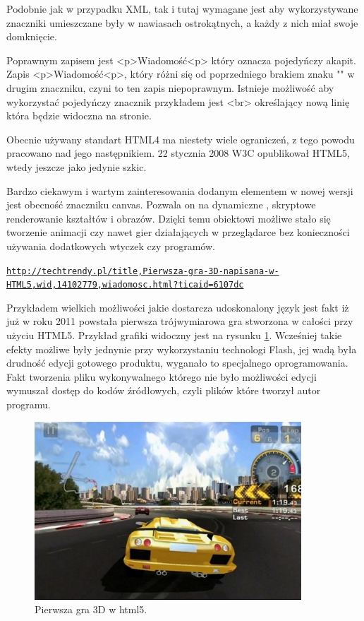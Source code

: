 Podobnie jak w przypadku XML, tak i tutaj wymagane jest aby wykorzystywane znaczniki umieszczane były w nawiasach ostrokątnych, a każdy z nich miał swoje domknięcie.

Poprawnym zapisem jest <p>Wiadomość<p> który oznacza pojedyńczy akapit. Zapis <p>Wiadomość<p>, który różni się od poprzedniego brakiem znaku "" w drugim znaczniku, czyni to ten zapis niepoprawnym. Istnieje możliwość aby wykorzystać pojedyńczy znacznik przykładem jest <br> określający nową linię która będzie widoczna na stronie.

Obecnie używany standart HTML4 ma niestety wiele ograniczeń, z tego powodu pracowano nad jego następnikiem. 22 stycznia 2008 W3C opublikował HTML5, wtedy jeszcze jako jedynie szkic.

Bardzo ciekawym i wartym zainteresowania dodanym elementem w nowej wersji jest obecność znaczniku canvas. Pozwala on na dynamiczne , skryptowe renderowanie kształtów i obrazów. Dzięki temu obiektowi możliwe stało się tworzenie animacji czy nawet gier działających w przeglądarce bez konieczności używania dodatkowych wtyczek czy programów.

\underline{\texttt{http://techtrendy.pl/title,Pierwsza-gra-3D-napisana-w-HTML5,wid,14102779,wiadomosc.html?ticaid=6107dc}}

Przykładem wielkich możliwości jakie dostarcza udoskonalony język jest fakt iż już w roku 2011 powstała pierwsza trójwymiarowa gra stworzona w całości przy użyciu HTML5. Przykład grafiki widoczny jest na rysunku \ref{fig:html3d}.
Wcześniej takie efekty możliwe były jednynie przy wykorzystaniu technologi Flash, jej wadą była drudność edycji gotowego produktu, wyganało to specjalnego oprogramowania. Fakt tworzenia pliku wykonywalnego którego nie było możliwości edycji wymuszał dostęp do kodów źródłowych, czyli plików które tworzył autor programu.

\begin{figure}[H]
  \centering
    \includegraphics[width=100mm]{ge/html5_3d.jpg}
  \caption{Pierwsza gra 3D w html5.}
  \label{fig:html3d}
\end{figure}

